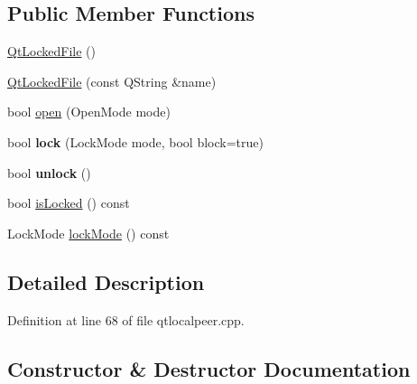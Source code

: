 \subsection*{Public Member Functions}
\begin{DoxyCompactItemize}
\item 
\hyperlink{class_qt_l_p___private_1_1_qt_l_p___private_1_1_qt_locked_file_a69bf1d82b1ca46f97466634d8f9587aa}{Qt\+Locked\+File} ()
\item 
\hyperlink{class_qt_l_p___private_1_1_qt_l_p___private_1_1_qt_locked_file_a8b7a228ae02dca4bb99743219d0cdb7b}{Qt\+Locked\+File} (const Q\+String \&name)
\item 
bool \hyperlink{class_qt_l_p___private_1_1_qt_l_p___private_1_1_qt_locked_file_a2e81bbaa7b1aaa83cf79284e66dbad79}{open} (Open\+Mode mode)
\item 
\mbox{\label{class_qt_l_p___private_1_1_qt_l_p___private_1_1_qt_locked_file_a140f1491633ecc2b774062e81f636785}} 
bool {\bfseries lock} (Lock\+Mode mode, bool block=true)
\item 
\mbox{\label{class_qt_l_p___private_1_1_qt_l_p___private_1_1_qt_locked_file_a42559844a9a94c702602748cd1280791}} 
bool {\bfseries unlock} ()
\item 
bool \hyperlink{class_qt_l_p___private_1_1_qt_l_p___private_1_1_qt_locked_file_a0800b8ae9f4d268fe6968b9075f64bb3}{is\+Locked} () const
\item 
Lock\+Mode \hyperlink{class_qt_l_p___private_1_1_qt_l_p___private_1_1_qt_locked_file_a0ae096d85cb722b1563521ad2b6dbde2}{lock\+Mode} () const
\end{DoxyCompactItemize}


\subsection{Detailed Description}


Definition at line 68 of file qtlocalpeer.\+cpp.



\subsection{Constructor \& Destructor Documentation}
\mbox{\label{class_qt_l_p___private_1_1_qt_l_p___private_1_1_qt_locked_file_a69bf1d82b1ca46f97466634d8f9587aa}} 
